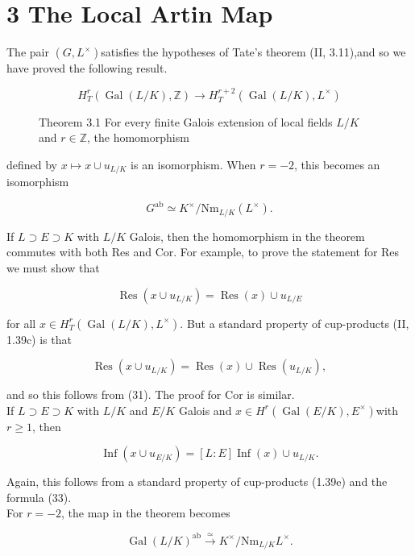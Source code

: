 \documentclass[10pt]{article}
\begin{document}
\section*{3 The Local Artin Map}
The pair $\left(G, L^{\times}\right)$satisfies the hypotheses of Tate's theorem (II, 3.11),and so we have proved the following result.

\begin{figure}[h]
\begin{center}
\captionsetup{labelformat=empty}
\caption{Theorem 3.1 For every finite Galois extension of local fields $L / K$ and $r \in \mathbb{Z}$, the homomorphism}
$$
H_{T}^{r}(\operatorname{Gal}(L / K), \mathbb{Z}) \rightarrow H_{T}^{r+2}\left(\operatorname{Gal}(L / K), L^{\times}\right)
$$\end{center}
\end{figure}

defined by $x \mapsto x \cup u_{L / K}$ is an isomorphism. When $r=-2$, this becomes an isomorphism

$$
G^{\mathrm{ab}} \simeq K^{\times} / \mathrm{Nm}_{L / K}\left(L^{\times}\right) .
$$

If $L \supset E \supset K$ with $L / K$ Galois, then the homomorphism in the theorem commutes with both Res and Cor. For example, to prove the statement for Res we must show that

$$
\operatorname{Res}\left(x \cup u_{L / K}\right)=\operatorname{Res}(x) \cup u_{L / E}
$$

for all $x \in H_{T}^{r}\left(\operatorname{Gal}(L / K), L^{\times}\right)$. But a standard property of cup-products (II, 1.39c) is that

$$
\operatorname{Res}\left(x \cup u_{L / K}\right)=\operatorname{Res}(x) \cup \operatorname{Res}\left(u_{L / K}\right),
$$

and so this follows from (31). The proof for Cor is similar.\\
If $L \supset E \supset K$ with $L / K$ and $E / K$ Galois and $x \in H^{r}\left(\operatorname{Gal}(E / K), E^{\times}\right)$with $r \geq 1$, then

$$
\operatorname{Inf}\left(x \cup u_{E / K}\right)=[L: E] \operatorname{Inf}(x) \cup u_{L / K} .
$$

Again, this follows from a standard property of cup-products (1.39e) and the formula (33).\\
For $r=-2$, the map in the theorem becomes

$$
\operatorname{Gal}(L / K)^{\mathrm{ab}} \xrightarrow{\simeq} K^{\times} / \mathrm{Nm}_{L / K} L^{\times} .
$$
\end{document}
